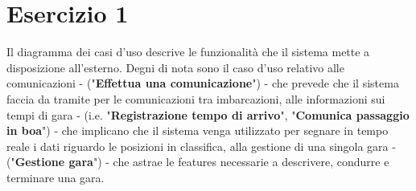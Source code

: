 \documentclass[10pt, openany, landscape]{book}
\begin{document}
\section{Esercizio 1}
Il diagramma dei casi d'uso descrive le funzionalit\`a che il sistema mette a disposizione all'esterno.
Degni di nota sono il caso d'uso relativo alle comunicazioni - ("\textbf{Effettua una comunicazione}") - che prevede che il sistema
faccia da tramite per le comunicazioni tra imbarcazioni, alle informazioni sui tempi di gara - (i.e. "\textbf{Registrazione
tempo di arrivo}", "\textbf{Comunica passaggio in boa}") - che implicano che il sistema venga utilizzato per segnare in tempo reale
i dati riguardo le posizioni in classifica, alla gestione di una singola gara - ("\textbf{Gestione gara}") - che astrae le
features necessarie a descrivere, condurre e terminare una gara.
\pagebreak
\end{document}
